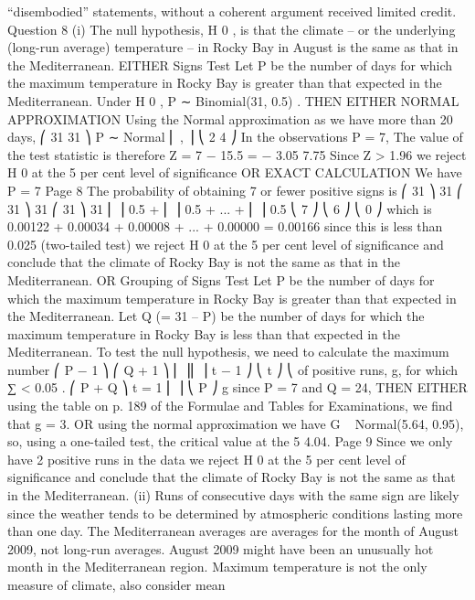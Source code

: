 \documentclass[a4paper,12pt]{article}
\begin{document}
\begin{enumerate}
“disembodied” statements, without a coherent argument received limited credit.
Question 8
(i)
The null hypothesis, H 0 , is that the climate – or the underlying (long-run average)
temperature – in Rocky Bay in August is the same as that in the Mediterranean.
EITHER
Signs Test
Let P be the number of days for which the maximum temperature in Rocky Bay is
greater than that expected in the Mediterranean.
Under H 0 , P ∼ Binomial(31, 0.5) .
THEN EITHER NORMAL APPROXIMATION
Using the Normal approximation as we have more than 20 days,
⎛ 31 31 ⎞
P ∼ Normal ⎜ , ⎟
⎝ 2 4 ⎠
In the observations P = 7,
The value of the test statistic is therefore
Z =
7 − 15.5
= − 3.05
7.75
Since Z > 1.96 we reject H 0 at the 5 per cent level of significance
OR EXACT CALCULATION
We have P = 7
Page 8 %
The probability of obtaining 7 or fewer positive signs is
⎛ 31 ⎞ 31 ⎛ 31 ⎞ 31
⎛ 31 ⎞ 31
⎜ ⎟ 0.5 + ⎜ ⎟ 0.5 + ... + ⎜ ⎟ 0.5
⎝ 7 ⎠
⎝ 6 ⎠
⎝ 0 ⎠
which is 0.00122 + 0.00034 + 0.00008 + ... + 0.00000 = 0.00166
since this is less than 0.025 (two-tailed test)
we reject H 0 at the 5 per cent level of significance
and conclude that the climate of Rocky Bay is not the same as that in the
Mediterranean.
OR
Grouping of Signs Test
Let P be the number of days for which the maximum temperature in Rocky Bay is
greater than that expected in the Mediterranean.
Let Q (= 31 – P) be the number of days for which the maximum temperature in Rocky
Bay is less than that expected in the Mediterranean.
To test the null hypothesis, we need to calculate the maximum number
⎛ P − 1 ⎞ ⎛ Q + 1 ⎞
⎜
⎟⎜
⎟
t − 1 ⎠ ⎝ t ⎠
⎝
of positive runs, g, for which ∑
< 0.05 .
⎛ P + Q ⎞
t = 1
⎜
⎟
⎝ P ⎠
g
since P = 7 and Q = 24,
THEN EITHER
using the table on p. 189 of the Formulae and Tables for Examinations,
we find that g = 3.
OR
using the normal approximation we have
G ~ Normal(5.64, 0.95),
so, using a one-tailed test, the critical value at the 5%
4.04.
Page 9 %
Since we only have 2 positive runs in the data we reject H 0 at the 5 per cent level of
significance and conclude that the climate of Rocky Bay is not the same as that in the
Mediterranean.
(ii)
Runs of consecutive days with the same sign are likely since the weather tends to be
determined by atmospheric conditions lasting more than one day.
The Mediterranean averages are averages for the month of August 2009,
not long-run averages.
August 2009 might have been an unusually hot month in the Mediterranean region.
Maximum temperature is not the only measure of climate, also consider mean

\end{enumerate}
\end{document}
